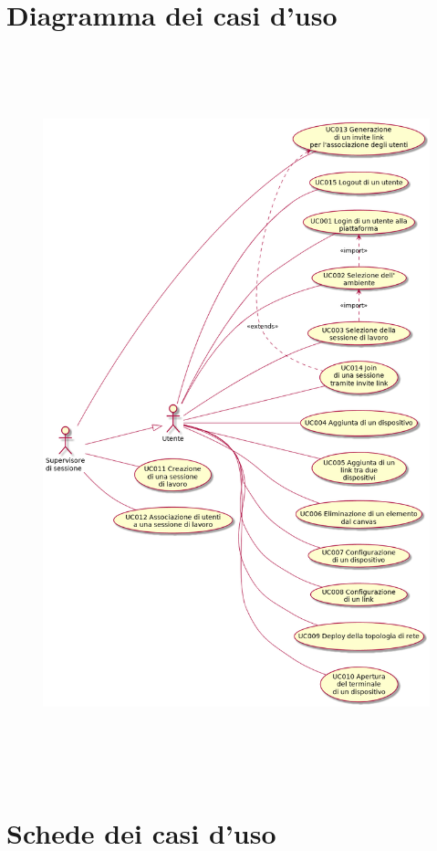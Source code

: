 \documentclass[../main.tex]{subfiles}
\begin{document}
\section{Diagramma dei casi d'uso}
\begin{figure}[H]
\centering
\includegraphics[height=21cm]{capitoli/diagramma-casi-d-uso.png}
\end{figure}
\newpage
\section{Schede dei casi d'uso}

\end{document}
